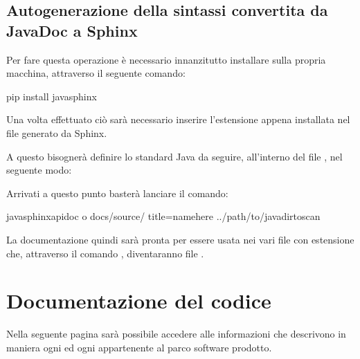 \documentclass[letterpaper,10pt,italian]{sphinxmanual}
\begin{document}
\section{Autogenerazione della sintassi convertita da JavaDoc a Sphinx}
\label{\detokenize{sphinx:autogenerazione-della-sintassi-convertita-da-javadoc-a-sphinx}}
Per fare questa operazione è necessario innanzitutto installare 
sulla propria macchina, attraverso il seguente comando:

\begin{sphinxVerbatim}[commandchars=\\\{\}]
\PYGZdl{} pip install javasphinx
\end{sphinxVerbatim}

Una volta effettuato ciò sarà necessario inserire l’estensione  appena installata
nel file  generato da Sphinx.

A questo bisognerà definire lo standard Java da seguire, all’interno del file
, nel seguente modo:


Arrivati a questo punto basterà lanciare il comando:

\begin{sphinxVerbatim}[commandchars=\\\{\}]
\PYGZdl{} javasphinx\PYGZhy{}apidoc \PYGZhy{}o docs/source/ \PYGZhy{}\PYGZhy{}title=\PYGZsq{}\PYGZlt{}name\PYGZus{}here\PYGZgt{}\PYGZsq{} ../path/to/java\PYGZus{}dirtoscan
\end{sphinxVerbatim}

La documentazione quindi sarà pronta per essere usata nei vari file con estensione  che, attraverso il comando , diventaranno file .


\chapter{Documentazione del codice}
\label{\detokenize{source/packages:documentazione-del-codice}}\label{\detokenize{source/packages::doc}}
Nella seguente pagina sarà possibile accedere alle informazioni che descrivono in maniera  ogni
 ed ogni  appartenente al parco software prodotto.
\end{document}
